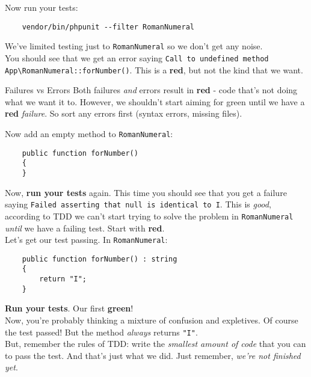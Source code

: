Now run your tests:

\begin{verbatim}
    vendor/bin/phpunit --filter RomanNumeral
\end{verbatim}

We've limited testing just to \texttt{RomanNumeral} so we don't get any noise.
\\

You should see that we get an error saying \texttt{Call to undefined method \\ App\textbackslash{}RomanNumeral::forNumber()}. This is a \textbf{red}, but not the kind that we want.

\begin{infobox}{Failures vs Errors}
    Both failures \textit{and} errors result in \textbf{red} - code that's not doing what we want it to. However, we shouldn't start aiming for green until we have a \textbf{red} \textit{failure}. So sort any errors first (syntax errors, missing files).
\end{infobox}

Now add an empty method to \texttt{RomanNumeral}:

\begin{verbatim}
    public function forNumber()
    {
    }
\end{verbatim}

Now, \textbf{run your tests} again. This time you should see that you get a failure saying \texttt{Failed asserting that null is identical to \textquotesingle{}I\textquotesingle{}}. This is \textit{good}, according to TDD we can't start trying to solve the problem in \texttt{RomanNumeral} \textit{until} we have a failing test. Start with \textbf{red}.
\\

Let's get our test passing. In \texttt{RomanNumeral}:

\begin{verbatim}
    public function forNumber() : string
    {
        return "I";
    }
\end{verbatim}

\textbf{Run your tests}. Our first \textbf{green}!
\\

Now, you're probably thinking a mixture of confusion and expletives. Of course the test passed! But the method \textit{always} returns \texttt{"I"}.
\\

But, remember the rules of TDD: write the \textit{smallest amount of code} that you can to pass the test. And that's just what we did. Just remember, \textit{we're not finished yet}.
\\

